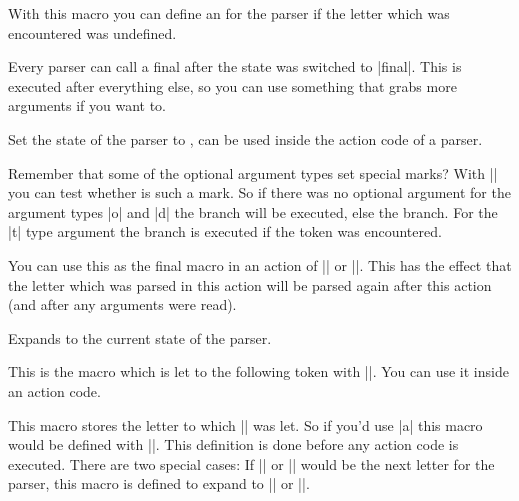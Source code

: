 \begin{command}
  {\pgfparserxdefunknown{}}
  With this macro you can define an  for the 
  parser if the letter which was encountered was undefined.
\end{command}

\begin{command}{\pgfparserxdeffinal{}}
  Every parser can call a final  after the state was switched to
  |final|. This  is executed after everything else, so you can use
  something that grabs more arguments if you want to.
\end{command}

\begin{command}{\pgfparserxswitch{}}
  Set the state of the parser to , can be used inside the action
  code of a parser.
\end{command}

\begin{command}{\pgfparserxifmark{}}
  Remember that some of the optional argument types set special marks? With
  |\pgfparserxifmark| you can test whether  is such a mark. So if
  there was no optional argument for the argument types |o| and |d| the
   branch will be executed, else the  branch. For the |t|
  type argument the  branch is executed if the token was encountered.
\end{command}

\begin{command}{\pgfparserxreinsert}
  You can use this as the final macro in an action of |\pgfparserxdef| or
  |\pgfparserxdefunknown|. This has the effect that the letter which was parsed
  in this action will be parsed again after this action (and after any arguments
  were read).
\end{command}

\begin{command}{\pgfparserxstate}
  Expands to the current state of the parser.
\end{command}

\begin{command}{\pgfparserxtoken}
  This is the macro which is let to the following token with |\futurelet|. You
  can use it inside an action code.
\end{command}

\begin{command}{\pgfparserxletter}
  This macro stores the letter to which |\pgfparserxtoken| was let. So if
  you'd use |a| this macro would be defined with
  |\def\pgfparserxletter{a}|. This definition is done before any action code is
  executed. There are two special cases: If |{| or |}| would be the next letter
  for the parser, this macro is defined to expand to |\bgroup| or |\egroup|.
\end{command}

